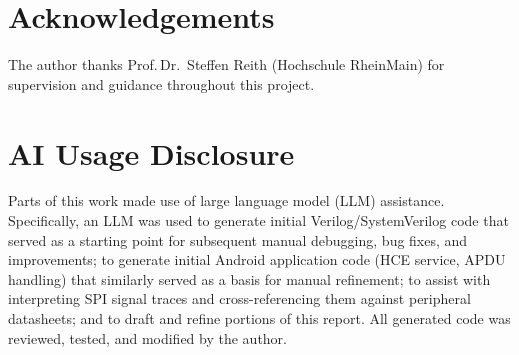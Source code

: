 \documentclass[manuscript,screen,nonacm]{acmart}
\begin{document}
\section*{Acknowledgements}
The author thanks Prof.\,Dr.\ Steffen Reith (Hochschule RheinMain)
for supervision and guidance throughout this project.

\section*{AI Usage Disclosure}
Parts of this work made use of large language model (LLM) assistance.
Specifically, an LLM was used to generate initial Verilog/SystemVerilog
code that served as a starting point for subsequent manual debugging,
bug fixes, and improvements; to generate initial Android application
code (HCE service, APDU handling) that similarly served as a basis for
manual refinement; to assist with interpreting SPI signal traces and
cross-referencing them against peripheral datasheets; and to draft and
refine portions of this report.
All generated code was reviewed, tested, and modified by the author.



\end{document}
